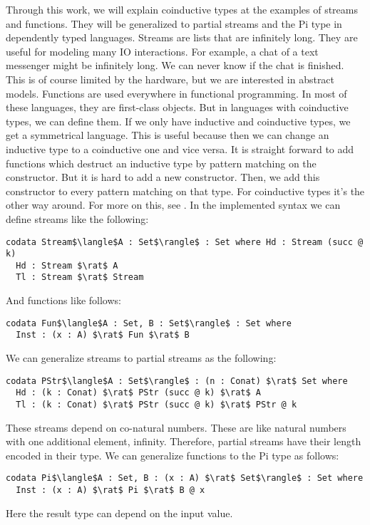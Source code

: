 \documentclass[a4paper,cleardoubleempty,BCOR1cm]{scrbook}
\begin{document}
Through this work, we will explain coinductive types at the examples of streams
and functions. They will be generalized to partial streams and the Pi type in
dependently typed languages. Streams are lists that are infinitely long. They
are useful for modeling many IO interactions. For example, a chat of a text
messenger might be infinitely long. We can never know if the chat is finished.
This is of course limited by the hardware, but we are interested in abstract
models. Functions are used everywhere in functional programming. In most of
these languages, they are first-class objects. But in languages with
coinductive types, we can define them. If we only have inductive and
coinductive types, we get a symmetrical language. This is useful because
then we can change an inductive type to a coinductive one and vice versa. It
is straight forward to add functions which destruct an inductive type by
pattern matching on the constructor. But it is hard to add a new constructor.
Then, we add this constructor to every pattern matching on that type.
For coinductive types it's the other way around. For more on this, see
\cite{binder2019decomposition}. In the implemented syntax we can define streams
like the following:
\begin{lstlisting}
codata Stream$\langle$A : Set$\rangle$ : Set where Hd : Stream (succ @ k)
  Hd : Stream $\rat$ A
  Tl : Stream $\rat$ Stream
\end{lstlisting}
And functions like follows:
\begin{lstlisting}
codata Fun$\langle$A : Set, B : Set$\rangle$ : Set where
  Inst : (x : A) $\rat$ Fun $\rat$ B
\end{lstlisting}
We can generalize streams to partial streams as the following:
\begin{lstlisting}
codata PStr$\langle$A : Set$\rangle$ : (n : Conat) $\rat$ Set where
  Hd : (k : Conat) $\rat$ PStr (succ @ k) $\rat$ A
  Tl : (k : Conat) $\rat$ PStr (succ @ k) $\rat$ PStr @ k
\end{lstlisting}
These streams depend on co-natural numbers.  These are like natural numbers
with one additional element, infinity.  Therefore, partial streams have
their length encoded in their type. We can generalize functions to the Pi type
as follows:
\begin{lstlisting}
codata Pi$\langle$A : Set, B : (x : A) $\rat$ Set$\rangle$ : Set where
  Inst : (x : A) $\rat$ Pi $\rat$ B @ x
\end{lstlisting}
Here the result type can depend on the input value.
\end{document}
